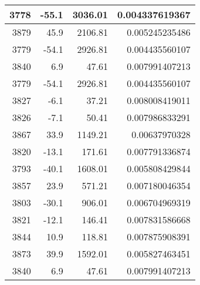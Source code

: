 \begin{longtable}{|r|r|r|r|}
3778                         & -55.1                           & 3036.01                     & 0.004337619367            \\ \hline
3879                         & 45.9                            & 2106.81                     & 0.005245235486            \\ \hline
3779                         & -54.1                           & 2926.81                     & 0.004435560107            \\ \hline
3840                         & 6.9                             & 47.61                       & 0.007991407213            \\ \hline
3779                         & -54.1                           & 2926.81                     & 0.004435560107            \\ \hline
3827                         & -6.1                            & 37.21                       & 0.008008419011            \\ \hline
3826                         & -7.1                            & 50.41                       & 0.007986833291            \\ \hline
3867                         & 33.9                            & 1149.21                     & 0.00637970328             \\ \hline
3820                         & -13.1                           & 171.61                      & 0.007791336874            \\ \hline
3793                         & -40.1                           & 1608.01                     & 0.005808429844            \\ \hline
3857                         & 23.9                            & 571.21                      & 0.007180046354            \\ \hline
3803                         & -30.1                           & 906.01                      & 0.006704969319            \\ \hline
3821                         & -12.1                           & 146.41                      & 0.007831586668            \\ \hline
3844                         & 10.9                            & 118.81                      & 0.007875908391            \\ \hline
3873                         & 39.9                            & 1592.01                     & 0.005827463451            \\ \hline
3840                         & 6.9                             & 47.61                       & 0.007991407213            \\ \hline

\end{longtable}

